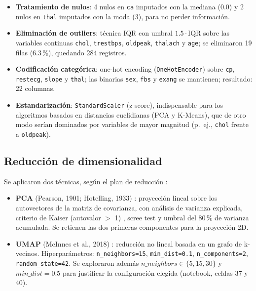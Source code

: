 \documentclass[11pt,a4paper]{article}
\begin{document}
\begin{itemize}
  \item \textbf{Tratamiento de nulos}: 4 nulos en \texttt{ca} imputados con la mediana (0.0)
        y 2 nulos en \texttt{thal} imputados con la moda (3), para no perder información.
  \item \textbf{Eliminación de outliers}: técnica IQR con umbral $1.5 \cdot \mathrm{IQR}$ sobre
        las variables continuas \texttt{chol}, \texttt{trestbps}, \texttt{oldpeak},
        \texttt{thalach} y \texttt{age}; se eliminaron 19 filas (6.3\,\%), quedando 284 registros.
  \item \textbf{Codificación categórica}: one-hot encoding (\texttt{OneHotEncoder}) sobre
        \texttt{cp}, \texttt{restecg}, \texttt{slope} y \texttt{thal}; las binarias
        \texttt{sex}, \texttt{fbs} y \texttt{exang} se mantienen; resultado: 22 columnas.
  \item \textbf{Estandarización}: \texttt{StandardScaler} (z-score), indispensable para los
        algoritmos basados en distancias euclidianas (PCA y K-Means), que de otro modo serían
        dominados por variables de mayor magnitud (p.~ej., \texttt{chol} frente a
        \texttt{oldpeak}).
\end{itemize}

\subsection{Reducción de dimensionalidad}

Se aplicaron dos técnicas, según el plan de reducción \cite{planificacion}:

\begin{itemize}
  \item \textbf{PCA} (Pearson, 1901; Hotelling, 1933) \cite{pearson1901,hotelling1933}:
        proyección lineal sobre los autovectores de la matriz de covarianza, con análisis de
        varianza explicada, criterio de Kaiser (autovalor $>$ 1) \cite{kaiser1960}, scree test
        \cite{cattell1966} y umbral del 80\,\% de varianza acumulada. Se retienen las dos
        primeras componentes para la proyección 2D.
  \item \textbf{UMAP} (McInnes et al., 2018) \cite{mcinnes2018}: reducción no lineal basada en
        un grafo de k-vecinos. Hiperparámetros: \texttt{n\_neighbors=15},
        \texttt{min\_dist=0.1}, \texttt{n\_components=2}, \texttt{random\_state=42}. Se
        exploraron además $n\_neighbors \in \{5, 15, 30\}$ y $min\_dist = 0.5$ para justificar
        la configuración elegida (notebook, celdas 37 y 40).
\end{itemize}
\end{document}
